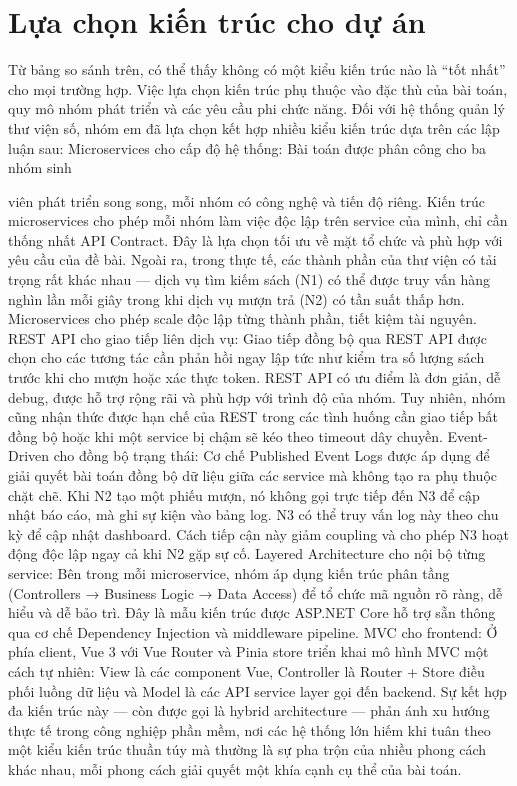 \section{Lựa chọn kiến trúc cho dự án}

Từ bảng so sánh trên, có thể thấy không có một kiểu kiến trúc nào là “tốt nhất” cho mọi trường hợp. Việc lựa chọn kiến trúc phụ thuộc vào đặc thù của bài toán, quy mô nhóm phát triển và các yêu cầu phi chức năng. Đối với hệ thống quản lý thư viện số, nhóm em đã lựa chọn kết hợp nhiều kiểu kiến trúc dựa trên các lập luận sau: Microservices cho cấp độ hệ thống: Bài toán được phân công cho ba nhóm sinh

viên phát triển song song, mỗi nhóm có công nghệ và tiến độ riêng. Kiến trúc microservices cho phép mỗi nhóm làm việc độc lập trên service của mình, chỉ cần thống nhất API Contract. Đây là lựa chọn tối ưu về mặt tổ chức và phù hợp với yêu cầu của đề bài. Ngoài ra, trong thực tế, các thành phần của thư viện có tải trọng rất khác nhau — dịch vụ tìm kiếm sách (N1) có thể được truy vấn hàng nghìn lần mỗi giây trong khi dịch vụ mượn trả (N2) có tần suất thấp hơn. Microservices cho phép scale độc lập từng thành phần, tiết kiệm tài nguyên. REST API cho giao tiếp liên dịch vụ: Giao tiếp đồng bộ qua REST API được chọn cho các tương tác cần phản hồi ngay lập tức như kiểm tra số lượng sách trước khi cho mượn hoặc xác thực token. REST API có ưu điểm là đơn giản, dễ debug, được hỗ trợ rộng rãi và phù hợp với trình độ của nhóm. Tuy nhiên, nhóm cũng nhận thức được hạn chế của REST trong các tình huống cần giao tiếp bất đồng bộ hoặc khi một service bị chậm sẽ kéo theo timeout dây chuyền. Event-Driven cho đồng bộ trạng thái: Cơ chế Published Event Logs được áp dụng để giải quyết bài toán đồng bộ dữ liệu giữa các service mà không tạo ra phụ thuộc chặt chẽ. Khi N2 tạo một phiếu mượn, nó không gọi trực tiếp đến N3 để cập nhật báo cáo, mà ghi sự kiện vào bảng log. N3 có thể truy vấn log này theo chu kỳ để cập nhật dashboard. Cách tiếp cận này giảm coupling và cho phép N3 hoạt động độc lập ngay cả khi N2 gặp sự cố. Layered Architecture cho nội bộ từng service: Bên trong mỗi microservice, nhóm áp dụng kiến trúc phân tầng (Controllers → Business Logic → Data Access) để tổ chức mã nguồn rõ ràng, dễ hiểu và dễ bảo trì. Đây là mẫu kiến trúc được ASP.NET Core hỗ trợ sẵn thông qua cơ chế Dependency Injection và middleware pipeline. MVC cho frontend: Ở phía client, Vue 3 với Vue Router và Pinia store triển khai mô hình MVC một cách tự nhiên: View là các component Vue, Controller là Router + Store điều phối luồng dữ liệu và Model là các API service layer gọi đến backend. Sự kết hợp đa kiến trúc này — còn được gọi là hybrid architecture — phản ánh xu hướng thực tế trong công nghiệp phần mềm, nơi các hệ thống lớn hiếm khi tuân theo một kiểu kiến trúc thuần túy mà thường là sự pha trộn của nhiều phong cách khác nhau, mỗi phong cách giải quyết một khía cạnh cụ thể của bài toán.
